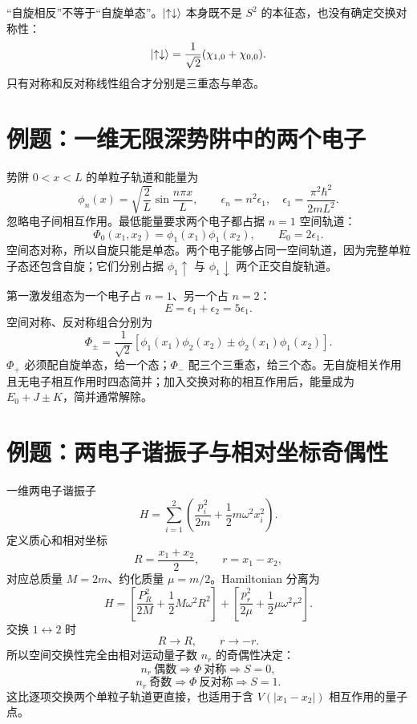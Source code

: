\begin{pitfallbox}
“自旋相反”不等于“自旋单态”。$\left|\uparrow\downarrow\right\rangle$ 本身既不是
$S^2$ 的本征态，也没有确定交换对称性：
\[
\left|\uparrow\downarrow\right\rangle
=\frac1{\sqrt2}(\chi_{1,0}+\chi_{0,0}).
\]
只有对称和反对称线性组合才分别是三重态与单态。
\end{pitfallbox}

\section{例题：一维无限深势阱中的两个电子}
\begin{examplebox}[title=例 2：基态、第一激发组态与简并度]
势阱 $0<x<L$ 的单粒子轨道和能量为
\[
\phi_n(x)=\sqrt{\frac2L}\sin\frac{n\pi x}{L},
\qquad
\epsilon_n=n^2\epsilon_1,\quad
\epsilon_1=\frac{\pi^2\hbar^2}{2mL^2}.
\]
忽略电子间相互作用。最低能量要求两个电子都占据 $n=1$ 空间轨道：
\[
\Phi_0(x_1,x_2)=\phi_1(x_1)\phi_1(x_2),
\qquad E_0=2\epsilon_1.
\]
空间态对称，所以自旋只能是单态。两个电子能够占同一空间轨道，因为完整单粒子态还包含自旋；它们分别占据
$\phi_1\uparrow$ 与 $\phi_1\downarrow$ 两个正交自旋轨道。

第一激发组态为一个电子占 $n=1$、另一个占 $n=2$：
\[
E=\epsilon_1+\epsilon_2=5\epsilon_1.
\]
空间对称、反对称组合分别为
\[
\Phi_\pm=\frac1{\sqrt2}
[\phi_1(x_1)\phi_2(x_2)\pm
\phi_2(x_1)\phi_1(x_2)].
\]
$\Phi_+$ 必须配自旋单态，给一个态；$\Phi_-$ 配三个三重态，给三个态。无自旋相关作用且无电子相互作用时四态简并；加入交换对称的相互作用后，能量成为
$E_0+J\pm K$，简并通常解除。
\end{examplebox}

\section{例题：两电子谐振子与相对坐标奇偶性}
\begin{examplebox}[title=例 3：交换等价于相对坐标反演]
一维两电子谐振子
\[
H=\sum_{i=1}^2\left(
\frac{p_i^2}{2m}+\frac12m\omega^2x_i^2\right).
\]
定义质心和相对坐标
\[
R=\frac{x_1+x_2}{2},\qquad r=x_1-x_2,
\]
对应总质量 $M=2m$、约化质量 $\mu=m/2$。Hamiltonian 分离为
\[
H=
\left[\frac{P_R^2}{2M}+\frac12M\omega^2R^2\right]
+\left[\frac{p_r^2}{2\mu}+\frac12\mu\omega^2r^2\right].
\]
交换 $1\leftrightarrow2$ 时
\[
R\to R,\qquad r\to-r.
\]
所以空间交换性完全由相对运动量子数 $n_r$ 的奇偶性决定：
\[
n_r\ \text{偶数}\Rightarrow\Phi\ \text{对称}\Rightarrow S=0,
\]
\[
n_r\ \text{奇数}\Rightarrow\Phi\ \text{反对称}\Rightarrow S=1.
\]
这比逐项交换两个单粒子轨道更直接，也适用于含 $V(|x_1-x_2|)$ 相互作用的量子点。
\end{examplebox}

